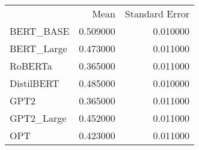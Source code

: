\begin{tabular}{lrr}
 & Mean & Standard Error \\
BERT_BASE & 0.509000 & 0.010000 \\
BERT_Large & 0.473000 & 0.011000 \\
RoBERTa & 0.365000 & 0.011000 \\
DistilBERT & 0.485000 & 0.010000 \\
GPT2 & 0.365000 & 0.011000 \\
GPT2_Large & 0.452000 & 0.011000 \\
OPT & 0.423000 & 0.011000 \\
\end{tabular}
